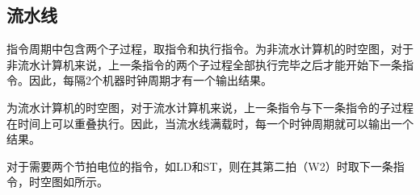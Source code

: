 \documentclass[lang=cn,11pt,a4paper,cite=authornum]{paper}
\begin{document}
\subsection{流水线}

指令周期中包含两个子过程，取指令和执行指令。为非流水计算机的时空图，对于非流水计算机来说，上一条指令的两个子过程全部执行完毕之后才能开始下一条指令。因此，每隔2个机器时钟周期才有一个输出结果。

为流水计算机的时空图，对于流水计算机来说，上一条指令与下一条指令的子过程在时间上可以重叠执行。因此，当流水线满载时，每一个时钟周期就可以输出一个结果。

对于需要两个节拍电位的指令，如LD和ST，则在其第二拍（W2）时取下一条指令，时空图如所示。

\begin{figure}[htbp]
    \centering
    

\end{figure}
\end{document}
